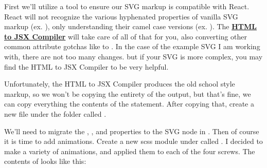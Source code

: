 \documentclass[a4paper,headinclude=on,footinclude=on,12pt,oneside]{scrbook}
\newcommand{\link}[2]{\textbf{\textcolor{monokaiPink}{\href{#2}{#1}}}}
\begin{document}
First we'll utilize a tool to ensure our SVG markup is compatible with React. React will not recognize the various hyphenated properties of vanilla SVG markup (ex. ), only understanding their camel case versions (ex. ). The \link{HTML to JSX Compiler}{https://magic.reactjs.net/htmltojsx.htm} will take care of all of that for you, also converting other common attribute gotchas like  to . In the case of the example SVG I am working with, there are not too many changes. but if your SVG is more complex, you may find the HTML to JSX Compiler to be very helpful.

Unfortunately, the HTML to JSX Compiler produces the old school  style markup, so we won't be copying the entirety of the output, but that's fine, we can copy everything the contents of the  statement. After copying that, create a new file under the  folder called .

We'll need to migrate the , , and  properties to the SVG node in . Then of course it is time to add animations. Create a new scss module under  called . I decided to make a variety of animations, and applied them to each of the four screws. The contents of  looks like this:

\end{document}
